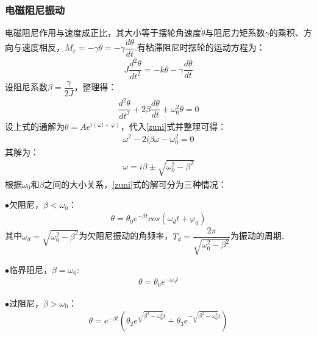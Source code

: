 \documentclass[12pt,a4paper,oneside,left=3.18,right=3.18,top=2.54,bottom=2.54]{ctexart}
\begin{document}
		\subsubsection{电磁阻尼振动}
			电磁阻尼作用与速度成正比，其大小等于摆轮角速度$\dot{\theta}$与阻尼力矩系数$\gamma$的乘积、方向与速度相反，$M_r=-\gamma\dot{\theta}=-\gamma\dfrac{d\theta}{dt}$.有粘滞阻尼时摆轮的运动方程为：
			\begin{equation}
			\begin{aligned}
			J\dfrac{d^2\theta}{dt^2}=-k\theta-\gamma\dfrac{d\theta}{dt}
			\end{aligned}
			\label{yundong}
			\end{equation}
			设阻尼系数$\beta=\dfrac{\gamma}{2J}$，整理得：
			\begin{equation}
			\begin{aligned}
			\dfrac{d^2\theta}{dt^2}+2\beta\dfrac{d\theta}{dt}+\omega_0^2\theta=0
			\end{aligned}
			\label{zuni}
			\end{equation}
			设上式的通解为$\theta=Ae^{i(\omega t+\varphi)}$，代入\eqref{zuni}式并整理可得：
			\begin{align}
			\omega^2-2i\beta\omega-\omega_0^2=0
			\end{align}
			其解为：
			\begin{align}
			\omega=i\beta\pm\sqrt{\omega_0^2-\beta^2}
			\end{align}
			根据$\omega_0$和$\beta$之间的大小关系，\eqref{zuni}式的解可分为三种情况：\par

			$\bullet$欠阻尼，$\beta<\omega_0$：
			\begin{equation}
			\begin{aligned}
			\theta=\theta_0e^{-\beta t}cos(\omega_dt+\varphi_0)
			\end{aligned}
			\label{qian}
			\end{equation}
			其中$\omega_d=\sqrt{\omega_0^2-\beta^2}$为欠阻尼振动的角频率，$T_d=\dfrac{2\pi}{\sqrt{\omega_0^2-\beta^2}}$为振动的周期.\par

			$\bullet$临界阻尼，$\beta=\omega_0$:
			\begin{align}
			\theta=\theta_0e^{-\omega_0t}
			\end{align}

			$\bullet$过阻尼，$\beta>\omega_0$：
			\begin{align}
			\theta=e^{-\beta t}\left(\theta_2e^{\sqrt{\beta^2-\omega_0^2}t}+\theta_3e^{-\sqrt{\beta^2-\omega_0^2}t}\right)
			\end{align}
\end{document}
